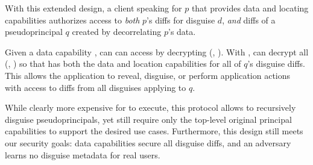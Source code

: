 With this extended design, a client speaking for $p$ that provides data and locating capabilities
authorizes access to \emph{both} $p$'s diffs for disguise $d$, \emph{and}
diffs of a pseudoprincipal $q$ created by
decorrelating $p$'s data. 

Given a data capability , \sys can can access  by decrypting \enc(,
).
%
With , \sys can decrypt all \enc(, ) so that \sys has both the data and
location capabilities for all of $q$'s disguise diffs. This allows the application to reveal,
disguise, or perform application actions with access to diffs from all disguises applying to $q$.

While clearly more expensive for \sys to execute, this protocol allows \sys to recursively disguise
pseudoprincipals, yet still require only the top-level original principal capabilities to support the
desired use cases. Furthermore, this design still meets our security goals: data capabilities secure
all disguise diffs, and an adversary learns no disguise metadata for real users.

%
